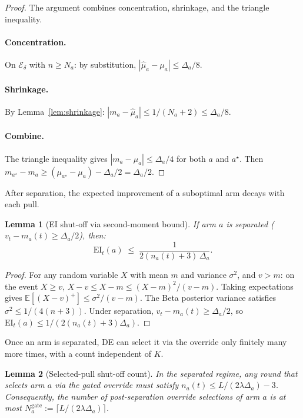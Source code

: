 \documentclass{article}
\newtheorem{lemma} {Lemma}
\newcommand{\E}{\mathbb{E}}
\newcommand{\EI}{\mathrm{EI}} %
\begin{document}
\begin{proof}
The argument combines concentration, shrinkage, and the triangle inequality.

\paragraph{Concentration.}
On $\mathcal{E}_\delta$ with $n \ge N_a$:
by substitution, $|\hat\mu_a - \mu_a| \le \Delta_a/8$.

\paragraph{Shrinkage.}
By Lemma~\ref{lem:shrinkage}: $|m_a - \hat\mu_a| \le 1/(N_a + 2) \le \Delta_a/8$.

\paragraph{Combine.}
The triangle inequality gives $|m_a - \mu_a| \le \Delta_a/4$ for both $a$ and $a^\star$.
Then $m_{a^\star} - m_a \ge (\mu_{a^\star} - \mu_a) - \Delta_a/2 = \Delta_a/2$.
\end{proof}


After separation, the expected improvement of a suboptimal arm decays with each pull.

\begin{lemma}[EI shut-off via second-moment bound]
\label{lem:ei_shutoff}
If arm $a$ is separated ($v_t - m_a(t) \ge \Delta_a/2$), then:
\[
  \EI_t(a) \;\le\; \frac{1}{2(n_a(t)+3)\,\Delta_a}.
\]
\end{lemma}

\begin{proof}
For any random variable $X$ with mean $m$ and variance $\sigma^2$, and $v > m$:
on the event $X \ge v$, $X - v \le X - m \le (X-m)^2/(v-m)$.
Taking expectations gives $\E[(X-v)^+] \le \sigma^2/(v-m)$.
The Beta posterior variance satisfies $\sigma^2 \le 1/(4(n+3))$.
Under separation, $v_t - m_a(t) \ge \Delta_a/2$, so $\EI_t(a) \le 1/(2(n_a(t)+3)\Delta_a)$.
\end{proof}


Once an arm is separated, DE can select it via the override only finitely many more times, with a count independent of $K$.

\begin{lemma}[Selected-pull shut-off count]
\label{lem:gate_count}
In the separated regime, any round that selects arm $a$ via the gated override must satisfy $n_a(t) \le L/(2\lambda\Delta_a) - 3$.
Consequently, the number of post-separation override selections of arm $a$ is at most $N_a^{\mathrm{gate}} := \lceil L/(2\lambda\Delta_a)\rceil$.
\end{lemma}
\end{document}

